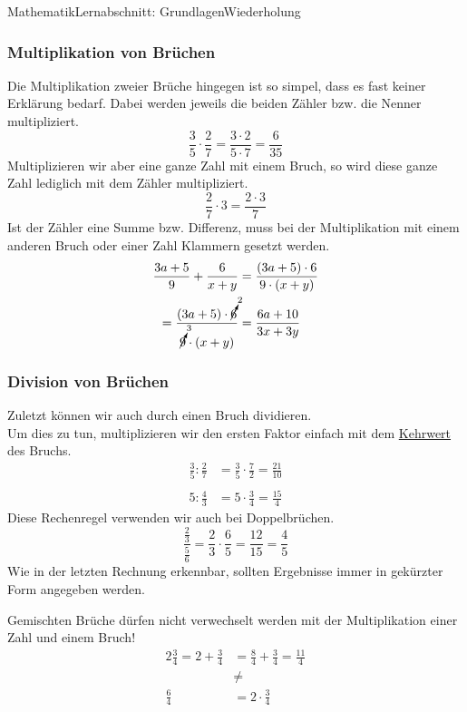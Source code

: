\documentclass[11pt,twocolumn,oneside,openany,headings=optiontotoc,11pt,numbers=noenddot]{article}
\begin{document}
\begin{worksheet}{Mathematik}{Lernabschnitt: Grundlagen}{Wiederholung}
		\subsubsection*{Multiplikation von Brüchen}
		Die Multiplikation zweier Brüche hingegen ist so simpel, dass es fast keiner Erklärung bedarf. Dabei werden jeweils die beiden Zähler bzw. die Nenner multipliziert.
		\[\frac{3}{5}\cdot{}\frac{2}{7} = \frac{3\cdot{}2}{5\cdot{}7} = \frac{6}{35}\]
		Multiplizieren wir aber eine ganze Zahl mit einem Bruch, so wird diese ganze Zahl lediglich mit dem Zähler multipliziert.
		\[\frac{2}{7}\cdot{}3 = \frac{2\cdot{}3}{7}\]
		\normalcolor{} Ist der Zähler eine Summe bzw. Differenz, muss bei der Multiplikation mit einem anderen Bruch oder einer Zahl Klammern gesetzt werden.
		\begin{align*}
			\frac{3a + 5}{9} + \frac{6}{x+y} & = \frac{(3a+5)\cdot{}6}{9\cdot{}(x+y)}\\
			= \frac{(3a+5)\cdot{}\cancelto{2}{6}}{\cancelto{3}{9}\cdot{}(x+y)} & = \frac{6a+10}{3x+3y}
		\end{align*}
		\subsubsection*{Division von Brüchen}
		Zuletzt können wir auch durch einen Bruch dividieren.\\
		Um dies zu tun, multiplizieren wir den ersten Faktor einfach mit dem \underline{Kehrwert} des Bruchs.
		\begin{align*}
			\frac{3}{5}:\frac{2}{7} & = \frac{3}{5}\cdot{}\frac{7}{2} = \frac{21}{10}\\
			\\
			5:\frac{4}{3} & = 5\cdot{}\frac{3}{4} = \frac{15}{4}
		\end{align*}
		Diese Rechenregel verwenden wir auch bei Doppelbrüchen.
		\[\frac{\frac{2}{3}}{\frac{5}{6}} = \frac{2}{3}\cdot{}\frac{6}{5} = \frac{12}{15} = \frac{4}{5}\]
		Wie in der letzten Rechnung erkennbar, sollten Ergebnisse immer in gekürzter Form angegeben werden.\\
		\par\noindent
		\normalcolor{} Gemischten Brüche dürfen nicht verwechselt werden mit der Multiplikation einer Zahl und einem Bruch!
		\begin{align*}
			2\frac{3}{4} = 2 + \frac{3}{4} & = \frac{8}{4} +\frac{3}{4} = \frac{11}{4}\\
			& \neq\\
			\frac{6}{4} & = 2\cdot{}\frac{3}{4}
		\end{align*}

\end{worksheet}
\end{document}
